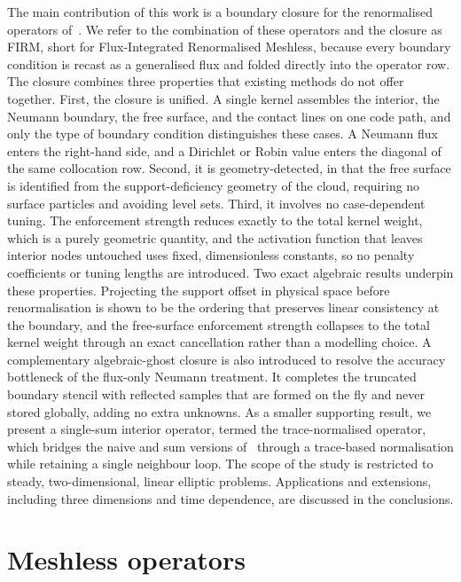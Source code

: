 \documentclass[preprint,review,12pt]{elsarticle}
\begin{document}
The main contribution of this work is a boundary closure for the renormalised operators of~\cite{Basic2018}.
We refer to the combination of these operators and the closure as FIRM, short for Flux-Integrated Renormalised Meshless, because every boundary condition is recast as a generalised flux and folded directly into the operator row.
The closure combines three properties that existing methods do not offer together.
First, the closure is unified.
A single kernel assembles the interior, the Neumann boundary, the free surface, and the contact lines on one code path, and only the type of boundary condition distinguishes these cases.
A Neumann flux enters the right-hand side, and a Dirichlet or Robin value enters the diagonal of the same collocation row.
Second, it is geometry-detected, in that the free surface is identified from the support-deficiency geometry of the cloud, requiring no surface particles and avoiding level sets.
Third, it involves no case-dependent tuning.
The enforcement strength reduces exactly to the total kernel weight, which is a purely geometric quantity, and the activation function that leaves interior nodes untouched uses fixed, dimensionless constants, so no penalty coefficients or tuning lengths are introduced.
Two exact algebraic results underpin these properties.
Projecting the support offset in physical space before renormalisation is shown to be the ordering that preserves linear consistency at the boundary, and the free-surface enforcement strength collapses to the total kernel weight through an exact cancellation rather than a modelling choice.
A complementary algebraic-ghost closure is also introduced to resolve the accuracy bottleneck of the flux-only Neumann treatment.
It completes the truncated boundary stencil with reflected samples that are formed on the fly and never stored globally, adding no extra unknowns.
As a smaller supporting result, we present a single-sum interior operator, termed the trace-normalised operator, which bridges the naive and sum versions of~\cite{Basic2018} through a trace-based normalisation while retaining a single neighbour loop.
The scope of the study is restricted to steady, two-dimensional, linear elliptic problems.
Applications and extensions, including three dimensions and time dependence, are discussed in the conclusions.

\section{Meshless operators}
\label{sec:operators}
\end{document}
